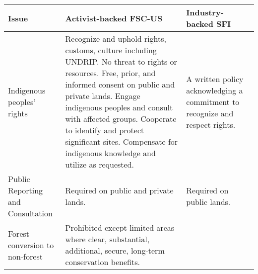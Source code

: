 \begin{longtable}[]{@{}lll@{}}
\toprule
\begin{minipage}[b]{0.20\columnwidth}\raggedright\strut
Issue\strut
\end{minipage} & \begin{minipage}[b]{0.36\columnwidth}\raggedright\strut
Activist-backed FSC-US\strut
\end{minipage} & \begin{minipage}[b]{0.36\columnwidth}\raggedright\strut
Industry-backed SFI\strut
\end{minipage}\tabularnewline
\midrule
\endhead
\begin{minipage}[t]{0.20\columnwidth}\raggedright\strut
Indigenous peoples' rights\strut
\end{minipage} & \begin{minipage}[t]{0.36\columnwidth}\raggedright\strut
Recognize and uphold rights, customs, culture including UNDRIP. No
threat to rights or resources. Free, prior, and informed consent on
public and private lands. Engage indigenous peoples and consult with
affected groups. Cooperate to identify and protect significant sites.
Compensate for indigenous knowledge and utilize as requested.\strut
\end{minipage} & \begin{minipage}[t]{0.36\columnwidth}\raggedright\strut
A written policy acknowledging a commitment to recognize and respect
rights.\strut
\end{minipage}\tabularnewline
\begin{minipage}[t]{0.20\columnwidth}\raggedright\strut
Public Reporting and Consultation\strut
\end{minipage} & \begin{minipage}[t]{0.36\columnwidth}\raggedright\strut
Required on public and private lands.\strut
\end{minipage} & \begin{minipage}[t]{0.36\columnwidth}\raggedright\strut
Required on public lands.\strut
\end{minipage}\tabularnewline
\begin{minipage}[t]{0.20\columnwidth}\raggedright\strut
Forest conversion to non-forest\strut
\end{minipage} & \begin{minipage}[t]{0.36\columnwidth}\raggedright\strut
Prohibited except limited areas where clear, substantial, additional,
secure, long-term conservation benefits.\strut
\end{minipage} & \begin{minipage}[t]{0.36\columnwidth}\raggedright\strut

\end{minipage}
\end{longtable}
